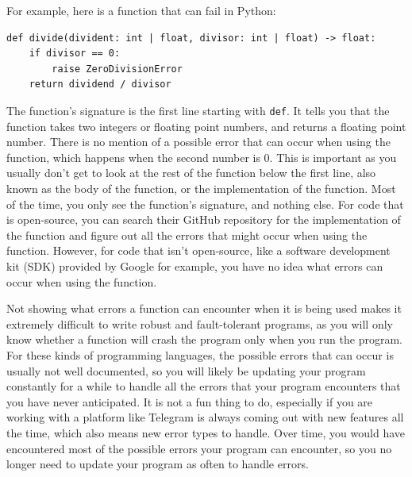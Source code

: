 \documentclass[11pt]{article}
\begin{document}
For example, here is a function that can fail in Python:
\begin{verbatim}
def divide(divident: int | float, divisor: int | float) -> float:
    if divisor == 0:
        raise ZeroDivisionError
    return dividend / divisor
\end{verbatim}

The function's signature is the first line
starting with \texttt{def}. It tells you that
the function takes two integers or floating
point numbers, and returns a floating point
number. There is no mention of a possible
error that can occur when using the function,
which happens when the second number is 0.
This is important as you usually don't get
to look at the rest of the function below
the first line, also known as the body of the
function, or the implementation of the function.
Most of the time, you only see the function's
signature, and nothing else. For code that
is open-source, you can search their GitHub
repository for the implementation of the
function and figure out all the errors
that might occur when using the function.
However, for code that isn't open-source,
like a software development kit (SDK) provided
by Google for example, you have no idea
what errors can occur when using the function.

 \newpage

Not showing what errors a function can encounter
when it is being used makes it extremely difficult
to write robust and fault-tolerant programs, as you
will only know whether a function will crash the program
only when you run the program. For these kinds of
programming languages, the possible errors that can
occur is usually not well documented, so you will likely
be updating your program constantly for a while to
handle all the errors that your program encounters that
you have never anticipated. It is not a fun thing to do,
especially if you are working with a platform like Telegram
is always coming out with new features all the time,
which also means new error types to handle. Over time,
you would have encountered most of the possible errors
your program can encounter, so you no longer need to
update your program as often to handle errors.
\end{document}
